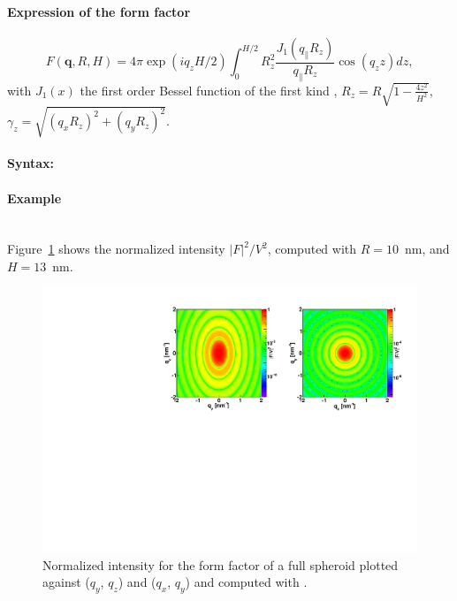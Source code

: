\paragraph{Expression of the form factor}
\begin{equation*}
F(\mathbf{q}, R, H) = 4\pi \exp(i q_z H/2) \int_0 ^{H/2}R_z ^2
\frac{J_1(q_{\parallel}R_z)}{q_{\parallel}R_z} \cos(q_z z) dz,
\end{equation*}
with $J_1(x)$ the first order
Bessel function of the first kind \cite{AbSt64},
$R_z = R\sqrt{1-\frac{4z^2}{H^2}}$, $\gamma_z = \sqrt{(q_x R_z)^2+(q_y R_z)^2}$.


\paragraph{Syntax:} 
\newpage

\paragraph{Example}\mbox{}\\
Figure~\ref{fig:FFfspheroidEx} shows the normalized intensity
$|F|^2/V^2$, computed with $R=10$~nm, and $H=13$~nm.
\begin{figure}[ht]
\begin{center}
\includegraphics[angle=-90,width=\textwidth]{Figures/ff/figfffspheroid.pdf}
\end{center}
\caption{Normalized intensity for the form factor of a full spheroid plotted against ($q_y$, $q_z$) and ($q_x$, $q_y$) and
  computed with .}
\label{fig:FFfspheroidEx}
\end{figure}

